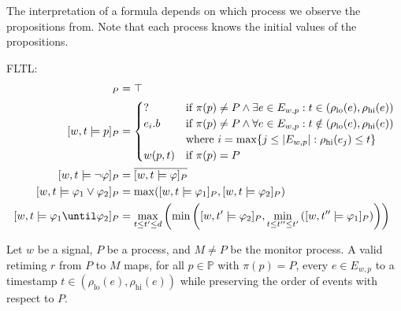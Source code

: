 The interpretation of a formula depends on which process we observe the propositions from.
Note that each process knows the initial values of the propositions.

\vspace{1em}
FLTL:
\begin{align*}
	[w,t \models \texttt{true}]_P &= \top \\
	[w,t \models p]_P &= \begin{cases}
		? &\text{if } \pi(p) \not = P \land \exists e \in E_{w,p} : t \in (\rho_{\text{lo}}(e), \rho_{\text{hi}}(e)) \\
		e_i.b &\text{if } \pi(p) \not = P \land \forall e \in E_{w,p} : t \notin (\rho_{\text{lo}}(e), \rho_{\text{hi}}(e)) \\
		&\text{where } i = \max\{j \leq |E_{w,p}| : \rho_{\text{hi}}(e_j) \leq t \} \\
		w(p,t) &\text{if } \pi(p) = P \\
	\end{cases} \\
	[w,t \models \lnot \varphi]_P &= \overline{[w,t \models \varphi]_P}\\
	[w,t \models \varphi_1 \lor \varphi_2]_P &= \max([w,t \models \varphi_1]_P, [w,t \models \varphi_2]_P)\\
	[w,t \models \varphi_1 \until \varphi_2]_P &= \max_{t \leq t' \leq d} \left( \min \left( [w,t' \models \varphi_2]_P, \min_{t \leq t'' \leq t'} \left( [w,t'' \models \varphi_1]_P \right) \right) \right)\\
\end{align*}


Let $w$ be a signal, $P$ be a process, and $M \neq P$ be the monitor process.
A valid retiming $r$ from $P$ to $M$ maps, for all $p \in \mathbb{P}$ with $\pi(p) = P$, every $e \in E_{w,p}$ to a timestamp $t \in (\rho_{\text{lo}}(e), \rho_{\text{hi}}(e))$ while preserving the order of events with respect to $P$.

